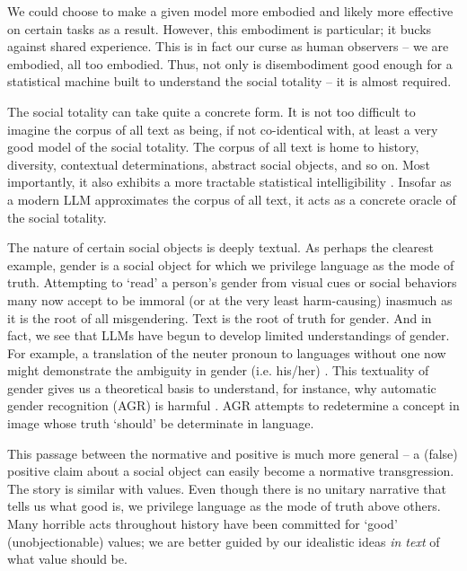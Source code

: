We could choose to make a given model more embodied and likely more effective on certain tasks as a result. However, this embodiment is particular; it bucks against shared experience. This is in fact our curse as human observers -- we are embodied, all too embodied. Thus, not only is disembodiment good enough for a statistical machine built to understand the social totality -- it is almost required.

The social totality can take quite a concrete form.
It is not too difficult to imagine the corpus of all text as being, if not co-identical with, at least a very good model of the social totality. The corpus of all text is home to history, diversity, contextual determinations, abstract social objects, and so on. Most importantly, it also exhibits a more tractable statistical intelligibility \citep{Lonergan:Insight}. Insofar as a modern LLM approximates the corpus of all text, it acts as a concrete oracle of the social totality.

The nature of certain social objects is deeply textual. As perhaps the clearest example, gender is a social object for which we privilege language as the mode of truth. Attempting to `read' a person's gender from visual cues or social behaviors many now accept to be immoral (or at the very least harm-causing) inasmuch as it is the root of all misgendering.
Text is the root of truth for gender.
And in fact, we see that LLMs have begun to develop limited understandings of gender. For example, a translation of the neuter pronoun to languages without one now might demonstrate the ambiguity in gender (i.e. his/her) \citep{Arcas:MachinesBehave}. This textuality of gender gives us a theoretical basis to understand, for instance, why automatic gender recognition (AGR) is harmful \citep{Keyes:MisgenderingMachinesAGR}. AGR attempts to redetermine a concept in image whose truth `should' be determinate in language.

This passage between the normative and positive is much more general -- a (false) positive claim about a social object can easily become a normative transgression. The story is similar with values. Even though there is no unitary narrative that tells us what good is, we privilege language as the mode of truth above others. Many horrible acts throughout history have been committed for `good' (unobjectionable) values; we are better guided by our idealistic ideas \textit{in text} of what value should be.

